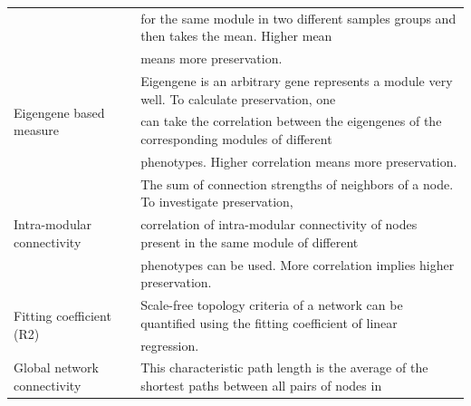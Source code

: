 \begin{table}[b]
{\begin{tabular}{@{}ll@{}}
                                                                                            & for the same module in two different samples groups and then takes the mean. Higher mean            \\
                                                                                            & means more preservation.                                                                            \\
\multirow{3}{*}{Eigengene based measure}                                                    & Eigengene is an arbitrary gene represents a module very well. To calculate preservation, one        \\
                                                                                            & can take the correlation between the eigengenes of the corresponding modules of different           \\
                                                                                            & phenotypes. Higher correlation means more preservation.                                             \\
\multirow{3}{*}{Intra-modular connectivity}                                                 & The sum of connection strengths of neighbors of a node. To investigate preservation,                \\
                                                                                            & correlation of intra-modular connectivity of nodes present in the same module of different          \\
                                                                                            & phenotypes can be used. More correlation implies higher preservation.                               \\
\multirow{2}{*}{Fitting coefficient (R2) \cite{Zhang2005a}}                                          & Scale-free topology criteria of a network can be quantified using the fitting coefficient of linear \\
                                                                                            & regression.                                                                                         \\
\multirow{2}{*}{Global network connectivity \cite{Taylor2009Feb}}                                      & This characteristic path length is the average of the shortest paths between all pairs of nodes in  \\

\end{tabular}}
\end{table}

